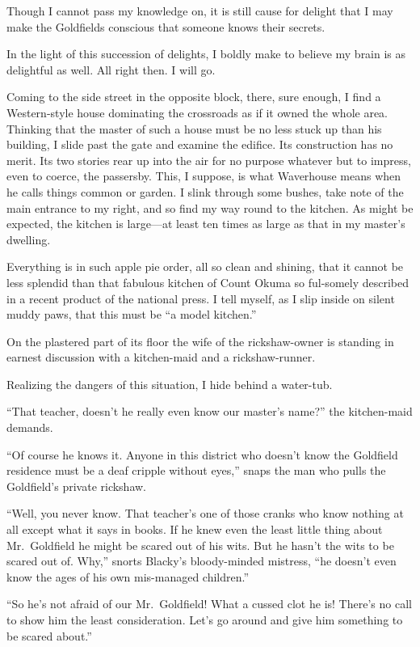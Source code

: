 \documentclass{book}
\begin{document}
Though I cannot pass my knowledge on, it is still cause for delight that
I may make the Goldfields conscious that someone knows their secrets.

In the light of this succession of delights, I boldly make to believe my
brain is as delightful as well. All right then. I will go.

Coming to the side street in the opposite block, there, sure enough, I
find a Western-style house dominating the crossroads as if it owned the
whole area. Thinking that the master of such a house must be no less
stuck up than his building, I slide past the gate and examine the
edifice. Its construction has no merit. Its two stories rear up into the
air for no purpose whatever but to impress, even to coerce, the
passersby. This, I suppose, is what Waverhouse means when he calls
things common or garden. I slink through some bushes, take note of the
main entrance to my right, and so find my way round to the kitchen. As
might be expected, the kitchen is large---at least ten times as large as
that in my master's dwelling.

Everything is in such apple pie order, all so clean and shining, that it
cannot be less splendid than that fabulous kitchen of Count Okuma so
ful-somely described in a recent product of the national press. I tell
myself, as I slip inside on silent muddy paws, that this must be ``a
model kitchen.''

On the plastered part of its floor the wife of the rickshaw-owner is
standing in earnest discussion with a kitchen-maid and a
rickshaw-runner.

Realizing the dangers of this situation, I hide behind a water-tub.

``That teacher, doesn't he really even know our master's name?'' the
kitchen-maid demands.

``Of course he knows it. Anyone in this district who doesn't know the
Goldfield residence must be a deaf cripple without eyes,'' snaps the man
who pulls the Goldfield's private rickshaw.

``Well, you never know. That teacher's one of those cranks who know
nothing at all except what it says in books. If he knew even the least
little thing about Mr.~Goldfield he might be scared out of his wits. But
he hasn't the wits to be scared out of. Why,'' snorts Blacky's
bloody-minded mistress, ``he doesn't even know the ages of his own
mis-managed children.''

``So he's not afraid of our Mr.~Goldfield! What a cussed clot he is!
There's no call to show him the least consideration. Let's go around and
give him something to be scared about.''
\end{document}
